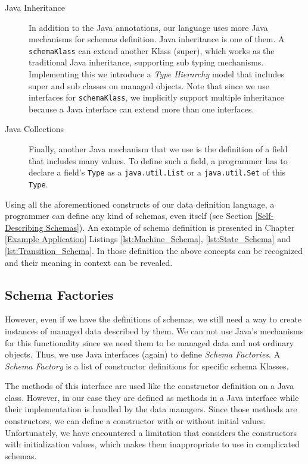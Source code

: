 \begin{description}
	\item [Java Inheritance] In addition to the Java annotations, our language uses more Java mechanisms for schemas definition. 
	Java inheritance is one of them. 
	A \texttt{schemaKlass} can extend another Klass (super), which works as the traditional Java inheritance, supporting sub typing mechanisms.
	Implementing this we introduce a \textit{Type Hierarchy} model that includes super and sub classes on managed objects.
	Note that since we use interfaces for \texttt{schemaKlass}, we implicitly support multiple inheritance because a Java interface can extend more than one interfaces.

	\item [Java Collections] Finally, another Java mechanism that we use is the definition of a field that includes many values.
	To define such a field, a programmer has to declare a field's \texttt{Type} as a \texttt{java.util.List} or a \texttt{java.util.Set} of this \texttt{Type}.

\end{description}

Using all the aforementioned constructs of our data definition language, a programmer can define any kind of schemas, even itself (see Section \ref{Self-Describing Schemas}).
An example of schema definition is presented in Chapter \ref{Example Application} Listings \ref{lst:Machine_Schema}, \ref{lst:State_Schema} and \ref{lst:Transition_Schema}.
In those definition the above concepts can be recognized and their meaning in context can be revealed.

\subsection{Schema Factories}\label{Schema Factories}
However, even if we have the definitions of schemas, we still need a way to create instances of managed data described by them.
We can not use Java's mechanisms for this functionality since we need them to be managed data and not ordinary objects.
Thus, we use Java interfaces (again) to define \textit{Schema Factories}.
A \textit{Schema Factory} is a list of constructor definitions for specific schema Klasses.

The methods of this interface are used like the constructor definition on a Java class.
However, in our case they are defined as methods in a Java interface while their implementation is handled by the data managers.
Since those methods are constructors, we can define a constructor with or without initial values.
Unfortunately, we have encountered a limitation that considers the constructors with initialization values, which makes them inappropriate to use in complicated schemas.

